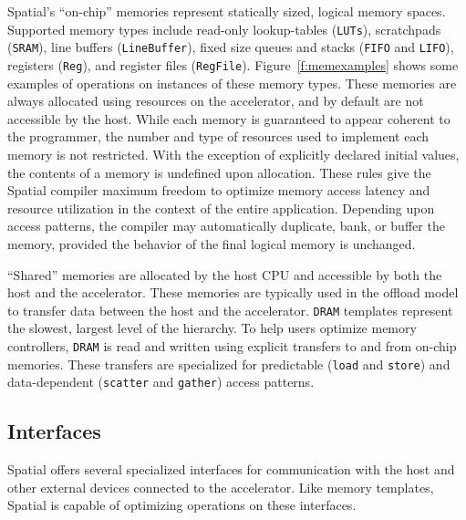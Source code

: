 Spatial's ``on-chip'' memories represent statically sized, logical memory spaces.
Supported memory types include read-only lookup-tables (\texttt{\small{LUTs}}), scratchpads (\texttt{\small{SRAM}}), line buffers (\texttt{\small{LineBuffer}}), fixed size queues and stacks (\texttt{\small{FIFO}} and \texttt{\small{LIFO}}),  registers (\texttt{\small{Reg}}), and register files (\texttt{\small{RegFile}}).
Figure~\ref{f:memexamples} shows some examples of operations on instances of these memory types.
These memories are always allocated using resources on the accelerator, and by default are not accessible by the host.
While each memory is guaranteed to appear coherent to the programmer, the number and type of resources used to implement each memory is not restricted.
With the exception of explicitly declared initial values, the contents of a memory is undefined upon allocation.
These rules give the Spatial compiler maximum freedom to optimize memory access latency and resource utilization in the context of the entire application.
Depending upon access patterns, the compiler may automatically duplicate, bank, or buffer the memory, provided the behavior of the final logical memory is unchanged.



``Shared'' memories are allocated by the host CPU and accessible by both the host and the accelerator.
These memories are typically used in the offload model to transfer data between the host and the accelerator.
\texttt{\small{DRAM}} templates represent the slowest, largest level of the hierarchy. To help users optimize
memory controllers, \texttt{\small{DRAM}} is read and written using explicit transfers to and from on-chip memories.
These transfers are specialized for predictable (\texttt{\small{load}} and \texttt{\small{store}}) and data-dependent
(\texttt{\small{scatter}} and \texttt{\small{gather}}) access patterns.


\subsection{Interfaces}
Spatial offers several specialized interfaces for communication with the host and other external devices connected to the accelerator. Like memory templates, Spatial is capable of optimizing operations on these interfaces.

